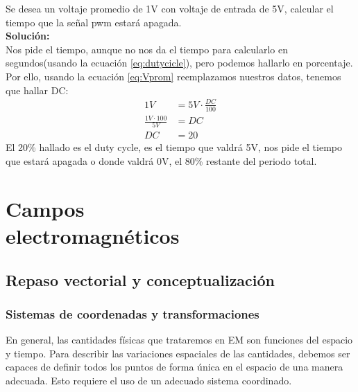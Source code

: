 \documentclass[11pt,fleqn]{book} %
\begin{document}
\begin{exercise}
Se desea un voltaje promedio de 1V con voltaje de entrada de 5V, calcular el tiempo que la señal pwm estará apagada.\\
\textbf{Solución:}\\
Nos pide el tiempo, aunque no nos da el tiempo para calcularlo en segundos(usando la ecuación \ref{eq:dutycicle}), pero podemos hallarlo en porcentaje. Por ello, usando la ecuación \ref{eq:Vprom} reemplazamos nuestros datos, tenemos que hallar DC:
\begin{equation}
\begin{split}
1V&=5V\cdot\frac{DC}{100}\\
\frac{1V\cdot 100}{5V}&=DC\\
DC&=20
\end{split}
\end{equation}
El 20\% hallado es el duty cycle, es el tiempo que valdrá 5V, nos pide el tiempo que estará apagada o donde valdrá 0V, el 80\% restante del periodo total.
\end{exercise}
\part{Campos \\electromagnéticos}
\chapter{Repaso vectorial y conceptualización}
\section{Sistemas de coordenadas y transformaciones}
En general, las cantidades físicas que trataremos en EM son funciones del espacio y tiempo. Para describir las variaciones espaciales de las cantidades, debemos ser capaces de definir todos los puntos de forma única en el espacio de una manera adecuada. Esto requiere el uso de un adecuado sistema coordinado.
\end{document}

